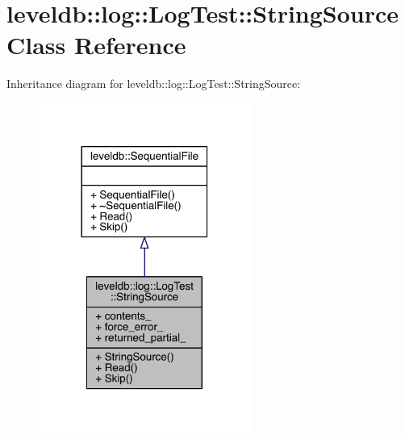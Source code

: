 \hypertarget{classleveldb_1_1log_1_1_log_test_1_1_string_source}{}\section{leveldb\+:\+:log\+:\+:Log\+Test\+:\+:String\+Source Class Reference}
\label{classleveldb_1_1log_1_1_log_test_1_1_string_source}


Inheritance diagram for leveldb\+:\+:log\+:\+:Log\+Test\+:\+:String\+Source\+:\nopagebreak
\begin{figure}[H]
\begin{center}
\leavevmode
\includegraphics[width=197pt]{classleveldb_1_1log_1_1_log_test_1_1_string_source__inherit__graph}
\end{center}
\end{figure}


